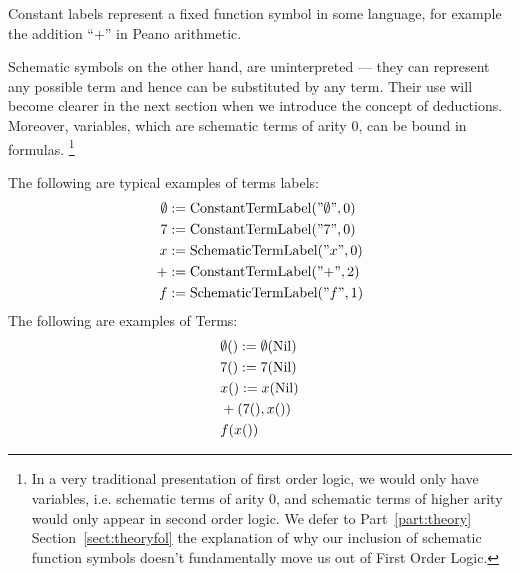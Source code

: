Constant labels represent a fixed function symbol in some language, for example the addition ``+'' in Peano arithmetic.

Schematic symbols on the other hand, are uninterpreted --- they can represent any possible term and hence can be substituted by any term. Their use will become clearer in the next section when we introduce the concept of deductions.  Moreover, variables, which are schematic terms of arity 0, can be bound in formulas. \footnote{In a very traditional presentation of first order logic, we would only have variables, i.e. schematic terms of arity 0, and schematic terms of higher arity would only appear in second order logic. We defer to Part~\ref{part:theory} Section~\ref{sect:theoryfol} the explanation of why our inclusion of schematic function symbols doesn't fundamentally move us out of First Order Logic.}

\begin{ex}[Terms]The following are typical examples of terms labels:
  \begin{align*}
    \emptyset &:= \operatorname{ConstantTermLabel}("\emptyset", 0) \\
    7 &:= \operatorname{ConstantTermLabel}("7", 0) \\
    x &:= \operatorname{SchematicTermLabel}("x", 0) \\
    + &:= \operatorname{ConstantTermLabel}("{+}", 2) \\
    f &:= \operatorname{SchematicTermLabel}("f", 1) \\
  \end{align*}
  The following are examples of Terms:
  \begin{align*}
    &\emptyset() := \emptyset(\operatorname{Nil})\\
    &7() := 7(\operatorname{Nil})\\
    &x() := x(\operatorname{Nil})\\
    &+(7(), x())\\
    &f(x())
  \end{align*}
  
\end{ex}



